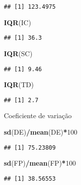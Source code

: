 \documentclass[]{article}
\newenvironment{Shaded}{\begin{snugshade}}{\end{snugshade}}
\newcommand{\DecValTok}[1]{\textcolor[rgb]{0.00,0.00,0.81}{#1}}
\newcommand{\KeywordTok}[1]{\textcolor[rgb]{0.13,0.29,0.53}{\textbf{#1}}}
\newcommand{\NormalTok}[1]{#1}
\newcommand{\OperatorTok}[1]{\textcolor[rgb]{0.81,0.36,0.00}{\textbf{#1}}}
\begin{document}
\begin{verbatim}
## [1] 123.4975
\end{verbatim}

\begin{Shaded}
\begin{Highlighting}[]
\KeywordTok{IQR}\NormalTok{(IC)}
\end{Highlighting}
\end{Shaded}

\begin{verbatim}
## [1] 36.3
\end{verbatim}

\begin{Shaded}
\begin{Highlighting}[]
\KeywordTok{IQR}\NormalTok{(SC)}
\end{Highlighting}
\end{Shaded}

\begin{verbatim}
## [1] 9.46
\end{verbatim}

\begin{Shaded}
\begin{Highlighting}[]
\KeywordTok{IQR}\NormalTok{(TD)}
\end{Highlighting}
\end{Shaded}

\begin{verbatim}
## [1] 2.7
\end{verbatim}

Coeficiente de variação

\begin{Shaded}
\begin{Highlighting}[]
\KeywordTok{sd}\NormalTok{(DE)}\OperatorTok{/}\KeywordTok{mean}\NormalTok{(DE)}\OperatorTok{*}\DecValTok{100}
\end{Highlighting}
\end{Shaded}

\begin{verbatim}
## [1] 75.23809
\end{verbatim}

\begin{Shaded}
\begin{Highlighting}[]
\KeywordTok{sd}\NormalTok{(FP)}\OperatorTok{/}\KeywordTok{mean}\NormalTok{(FP)}\OperatorTok{*}\DecValTok{100}
\end{Highlighting}
\end{Shaded}

\begin{verbatim}
## [1] 38.56553
\end{verbatim}
\end{document}
